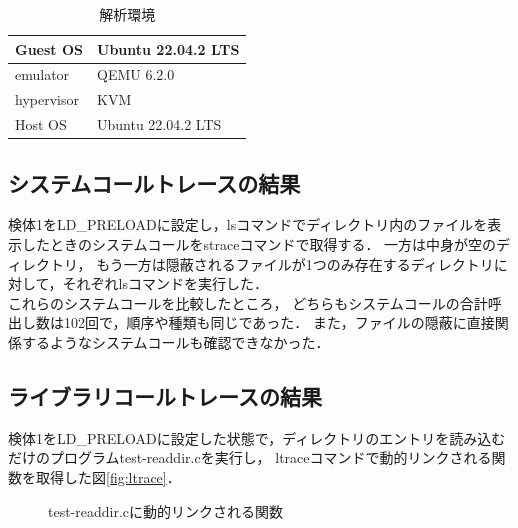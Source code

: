 \documentclass[submit,techreq,noauthor]{eco}	%
\begin{document}
\begin{table}[H]
  \caption{解析環境}
  \label{table: 解析環境}
  \centering
  \begin{tabular}{|l|l|}
  \hline
  Guest OS   & Ubuntu 22.04.2 LTS \\ \hline
  emulator   & QEMU 6.2.0         \\ \hline
  hypervisor & KVM                \\ \hline
  Host OS    & Ubuntu 22.04.2 LTS \\ \hline
  \end{tabular}
\end{table}


\subsection{システムコールトレースの結果}
検体1をLD\_PRELOADに設定し，lsコマンドでディレクトリ内のファイルを表示したときのシステムコールをstraceコマンドで取得する．
一方は中身が空のディレクトリ，
もう一方は隠蔽されるファイルが1つのみ存在するディレクトリに対して，それぞれlsコマンドを実行した．\\
\indent
これらのシステムコールを比較したところ，
どちらもシステムコールの合計呼出し数は102回で，順序や種類も同じであった．
また，ファイルの隠蔽に直接関係するようなシステムコールも確認できなかった．

\subsection{ライブラリコールトレースの結果}
検体1をLD\_PRELOADに設定した状態で，ディレクトリのエントリを読み込むだけのプログラムtest-readdir.cを実行し，
ltraceコマンドで動的リンクされる関数を取得した\lbrack 図\ref{fig:ltrace}\rbrack．

\begin{figure}[H]
	\centering
	\caption{test-readdir.cに動的リンクされる関数}
	\label{fig:readdir}
\end{figure}
\end{document}

